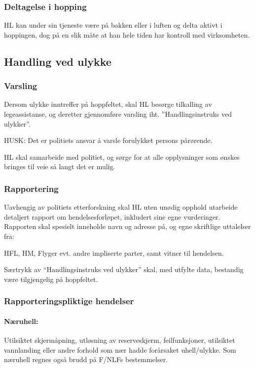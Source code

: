 \subsubsection{Deltagelse i hopping}
HL kan under sin tjeneste være på bakken eller i luften og delta aktivt i hoppingen, dog på en slik måte at han hele tiden har kontroll med virksomheten.

\subsection{Handling ved ulykke}
\subsubsection{Varsling}
Dersom ulykke inntreffer på hoppfeltet, skal HL besørge tilkalling av legeassistanse, og deretter gjennomføre varsling iht. ”Handlingsinstruks ved ulykker”.

HUSK: Det er politiets ansvar å varsle forulykket persons pårørende.

HL skal samarbeide med politiet, og sørge for at alle opplysninger som ønskes bringes til veie så langt det er mulig.

\subsubsection{Rapportering}
Uavhengig av politiets etterforskning skal HL uten unødig opphold utarbeide detaljert rapport om hendelsesforløpet, inkludert sine egne vurderinger. Rapporten skal spesielt inneholde navn og adresse på, og egne skriftlige uttalelser fra:

HFL, HM, Flyger evt. andre impliserte parter, samt vitner til hendelsen.

Særtrykk av ``Handlingsinstruks ved ulykker'' skal, med utfylte data, bestandig være tilgjengelig på hoppfeltet.

\subsubsection{Rapporteringspliktige hendelser}
\paragraph{Næruhell:}
Utilsiktet skjermåpning, utløsning av reserveskjerm, feilfunksjoner, utilsiktet vannlanding eller andre forhold som nær hadde forårsaket uhell/ulykke. Som næruhell regnes også brudd på F/NLFs bestemmelser.

